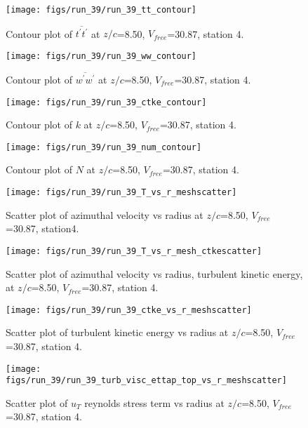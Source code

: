 \begin{figure}[H]
\centering
\texttt{[image: figs/run\_39/run\_39\_tt\_contour]}
\caption{Contour plot of $\overline{t^\prime t^\prime}$ at $z/c$=8.50, $V_{free}$=30.87, station 4.}
\end{figure}


\begin{figure}[H]
\centering
\texttt{[image: figs/run\_39/run\_39\_ww\_contour]}
\caption{Contour plot of $\overline{w^\prime w^\prime}$ at $z/c$=8.50, $V_{free}$=30.87, station 4.}
\end{figure}


\begin{figure}[H]
\centering
\texttt{[image: figs/run\_39/run\_39\_ctke\_contour]}
\caption{Contour plot of $k$ at $z/c$=8.50, $V_{free}$=30.87, station 4.}
\end{figure}


\begin{figure}[H]
\centering
\texttt{[image: figs/run\_39/run\_39\_num\_contour]}
\caption{Contour plot of $N$ at $z/c$=8.50, $V_{free}$=30.87, station 4.}
\end{figure}


\begin{figure}[H]
\centering
\texttt{[image: figs/run\_39/run\_39\_T\_vs\_r\_meshscatter]}
\caption{Scatter plot of azimuthal velocity vs radius at $z/c$=8.50, $V_{free}$=30.87, station4.}
\end{figure}


\begin{figure}[H]
\centering
\texttt{[image: figs/run\_39/run\_39\_T\_vs\_r\_mesh\_ctkescatter]}
\caption{Scatter plot of azimuthal velocity vs radius, turbulent kinetic energy, at $z/c$=8.50, $V_{free}$=30.87, station 4.}
\end{figure}


\begin{figure}[H]
\centering
\texttt{[image: figs/run\_39/run\_39\_ctke\_vs\_r\_meshscatter]}
\caption{Scatter plot of turbulent kinetic energy vs radius at $z/c$=8.50, $V_{free}$=30.87, station 4.}
\end{figure}


\begin{figure}[H]
\centering
\texttt{[image: figs/run\_39/run\_39\_turb\_visc\_ettap\_top\_vs\_r\_meshscatter]}
\caption{Scatter plot of $
u_T$ reynolds stress term vs radius at $z/c$=8.50, $V_{free}$=30.87, station 4.}
\end{figure}


